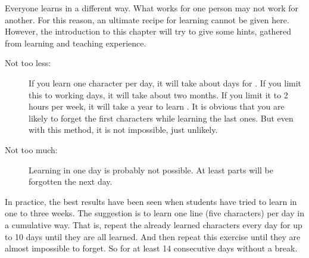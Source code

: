 
\normalsize

Everyone learns in a different way. What works for one person may not work for
another. For this reason, an ultimate recipe for learning \textbf{\jtopic}
cannot be given here. However, the introduction to this chapter will try to
give some hints, gathered from learning and teaching experience.

\begin{description}

\item[Not too less:] If you learn one character per day, it will take about
        \jkanacount{} days for \textbf{\jtopic}. If you limit this to working
        days, it will take about two months. If you limit it to 2 hours per
        week, it will take a year to learn \textbf{\jtopic}. It is obvious
        that you are likely to forget the first characters while learning the
        last ones. But even with this method, it is not impossible, just
        unlikely.

\item[Not too much:] Learning \textbf{\jtopic} in one day is probably not
        possible. At least parts will be forgotten the next day.

\end{description}

In practice, the best results have been seen when students have tried to learn
\textbf{\jtopic} in one to three weeks. The suggestion is to learn one line
(five characters) per day in a cumulative way. That is, repeat the already
learned characters every day for up to 10 days until they are all learned. And
then repeat this exercise until they are almost impossible to forget. So for at
least 14 consecutive days without a break.

